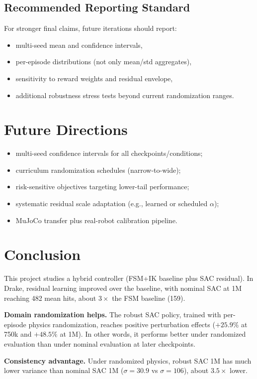 \documentclass[10pt,twocolumn,letterpaper]{article}
\begin{document}
\subsection{Recommended Reporting Standard}
For stronger final claims, future iterations should report:
\begin{itemize}[leftmargin=*,noitemsep]
    \item multi-seed mean and confidence intervals,
    \item per-episode distributions (not only mean/std aggregates),
    \item sensitivity to reward weights and residual envelope,
    \item additional robustness stress tests beyond current randomization ranges.
\end{itemize}

\section{Future Directions}
\begin{itemize}[leftmargin=*,noitemsep]
    \item multi-seed confidence intervals for all checkpoints/conditions;
    \item curriculum randomization schedules (narrow-to-wide);
    \item risk-sensitive objectives targeting lower-tail performance;
    \item systematic residual scale adaptation (e.g., learned or scheduled $\alpha$);
    \item MuJoCo transfer plus real-robot calibration pipeline.
\end{itemize}

\section{Conclusion}
This project studies a hybrid controller (FSM+IK baseline plus SAC residual). In Drake, residual learning improved over the baseline, with nominal SAC at 1M reaching 482 mean hits, about $3\times$ the FSM baseline (159).

\textbf{Domain randomization helps.} The robust SAC policy, trained with per-episode physics randomization, reaches positive perturbation effects ($+25.9\%$ at 750k and $+48.5\%$ at 1M). In other words, it performs better under randomized evaluation than under nominal evaluation at later checkpoints.

\textbf{Consistency advantage.} Under randomized physics, robust SAC 1M has much lower variance than nominal SAC 1M ($\sigma = 30.9$ vs $\sigma = 106$), about $3.5\times$ lower.
\end{document}

